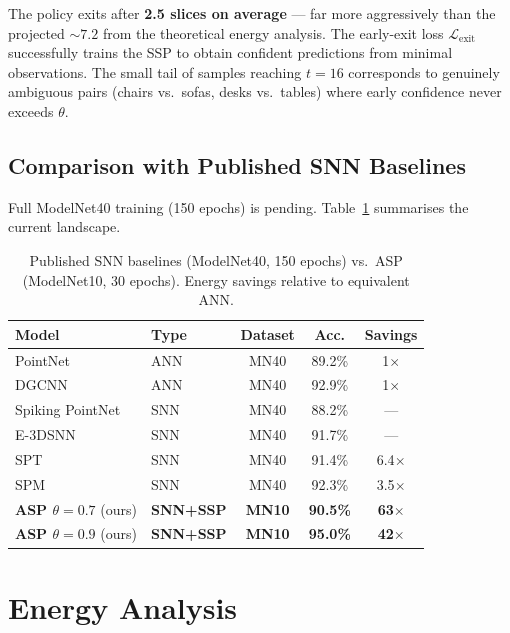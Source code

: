 \documentclass[11pt,a4paper]{article}
\begin{document}
The policy exits after \textbf{2.5 slices on average} --- far more aggressively
than the projected ${\sim}7.2$ from the theoretical energy analysis. The
early-exit loss $\mathcal{L}_\text{exit}$ successfully trains the SSP to obtain
confident predictions from minimal observations. The small tail of samples
reaching $t{=}16$ corresponds to genuinely ambiguous pairs (chairs vs.\ sofas,
desks vs.\ tables) where early confidence never exceeds $\theta$.

\subsection{Comparison with Published SNN Baselines}

Full ModelNet40 training (150 epochs) is pending. Table~\ref{tab:baselines}
summarises the current landscape.

\begin{table}[H]
  \centering
  \caption{Published SNN baselines (ModelNet40, 150 epochs) vs.\ ASP
           (ModelNet10, 30 epochs). Energy savings relative to equivalent ANN.}
  \label{tab:baselines}
  \begin{tabular}{llccc}
    \toprule
    \textbf{Model} & \textbf{Type} & \textbf{Dataset} & \textbf{Acc.} & \textbf{Savings} \\
    \midrule
    PointNet~\cite{qi2017}    & ANN  & MN40 & 89.2\% & 1$\times$ \\
    DGCNN~\cite{dgcnn}        & ANN  & MN40 & 92.9\% & 1$\times$ \\
    \midrule
    Spiking PointNet~\cite{spiking_ptnet} & SNN & MN40 & 88.2\% & --- \\
    E-3DSNN~\cite{e3dsnn}     & SNN  & MN40 & 91.7\% & --- \\
    SPT~\cite{spt}            & SNN  & MN40 & 91.4\% & 6.4$\times$ \\
    SPM~\cite{spm2025}        & SNN  & MN40 & 92.3\% & 3.5$\times$ \\
    \midrule
    \textbf{ASP $\theta{=}0.7$} (ours) & \textbf{SNN+SSP} & \textbf{MN10} & \textbf{90.5\%} & \textbf{63$\times$} \\
    \textbf{ASP $\theta{=}0.9$} (ours) & \textbf{SNN+SSP} & \textbf{MN10} & \textbf{95.0\%} & \textbf{42$\times$} \\
    \bottomrule
  \end{tabular}
\end{table}

\section{Energy Analysis}
\end{document}
